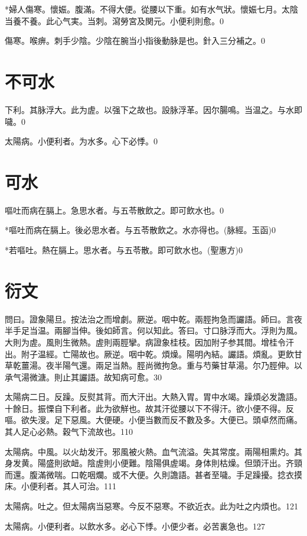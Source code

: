 \documentclass[12pt,twoside,UTF8,b5paper]{ctexbook}
\begin{document}
*婦人傷寒。懷娠。腹滿。不得大便。從腰以下重。如有水气狀。懷娠七月。太陰当養不養。此心气実。当刺。瀉勞宮及関元。小便利則愈。0

傷寒。喉痹。刺手少陰。少陰在腕当小指後動脉是也。針入三分補之。0

\chapter{不可水}

下利。其脉浮大。此为虗。以强下之故也。設脉浮革。因尔腸鳴。当温之。与水即噦。0

太陽病。小便利者。为水多。心下必悸。0

\chapter{可水}

嘔吐而病在膈上。急思水者。与五苓散飲之。即可飲水也。0

*嘔吐而病在膈上。後必思水者。与五苓散飲之。水亦得也。(脉經。玉函)0

*若嘔吐。熱在膈上。思水者。与五苓散。即可飲水也。(聖惠方)0

\chapter{衍文}

問曰。證象陽旦。按法治之而增劇。厥逆。咽中乾。兩脛拘急而讝語。師曰。言夜半手足当温。兩腳当伸。後如師言。何以知此。答曰。寸口脉浮而大。浮則为風。大則为虗。風則生微熱。虗則兩脛攣。病證象桂枝。因加附子参其間。增桂令汗出。附子温經。亡陽故也。厥逆。咽中乾。煩燥。陽明內結。讝語。煩亂。更飲甘草乾薑湯。夜半陽气還。兩足当熱。脛尚微拘急。重与芍藥甘草湯。尔乃脛伸。以承气湯微溏。則止其讝語。故知病可愈。30

太陽病二日。反躁。反熨其背。而大汗出。大熱入胃。胃中水竭。躁煩必发譫語。十餘日。振慄自下利者。此为欲觧也。故其汗從腰以下不得汗。欲小便不得。反嘔。欲失溲。足下惡風。大便硬。小便当數而反不數及多。大便已。頭卓然而痛。其人足心必熱。穀气下流故也。110

太陽病。中風。以火劫发汗。邪風被火熱。血气流溢。失其常度。兩陽相熏灼。其身发黄。陽盛則欲衄。陰虗則小便難。陰陽俱虗竭。身体則枯燥。但頭汗出。齐頸而還。腹滿微喘。口乾咽爛。或不大便。久則譫語。甚者至噦。手足躁擾。捻衣摸床。小便利者。其人可治。111

太陽病。吐之。但太陽病当惡寒。今反不惡寒。不欲近衣。此为吐之内煩也。121

太陽病。小便利者。以飲水多。必心下悸。小便少者。必苦裏急也。127
\end{document}
